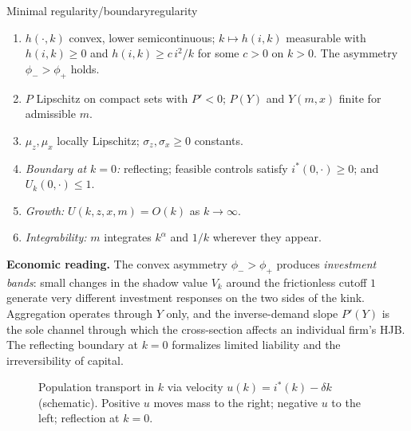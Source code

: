 ﻿\documentclass[11pt,letterpaper,oneside]{article}
\numberwithin{equation}{section}
\newcommand{\1}{\mathbf{1}}
\begin{document}
\begin{assumption}{Minimal regularity/boundary}{regularity}
\begin{enumerate}[label=(\alph*),itemsep=0.2em]
\item $h(\cdot,k)$ convex, lower semicontinuous; $k\mapsto h(i,k)$ measurable with $h(i,k)\ge 0$ and $h(i,k)\ge c\,i^2/k$ for some $c>0$ on $k>0$. The asymmetry $\phi_->\phi_+$ holds.
\item $P$ Lipschitz on compact sets with $P'<0$; $P(Y)$ and $Y(m,x)$ finite for admissible $m$.
\item $\mu_z,\mu_x$ locally Lipschitz; $\sigma_z,\sigma_x\ge 0$ constants.
\item \emph{Boundary at $k=0$:} reflecting; feasible controls satisfy $i^*(0,\cdot)\ge 0$; and $U_k(0,\cdot)\le 1$.
\item \emph{Growth:} $U(k,z,x,m)=O(k)$ as $k\to\infty$.
\item \emph{Integrability:} $m$ integrates $k^\alpha$ and $1/k$ wherever they appear.
\end{enumerate}
\end{assumption}

\begin{tcolorbox}[didacticstyle]
\textbf{Economic reading.} The convex asymmetry $\phi_->\phi_+$ produces \emph{investment bands}: small changes in the shadow value $V_k$ around the frictionless cutoff $1$ generate very different investment responses on the two sides of the kink. Aggregation operates through $Y$ only, and the inverse-demand slope $P'(Y)$ is the sole channel through which the cross-section affects an individual firm's HJB. The reflecting boundary at $k=0$ formalizes limited liability and the irreversibility of capital.
\end{tcolorbox}

\begin{figure}[ht]
\centering
{}
\caption{Population transport in $k$ via velocity $u(k)=i^*(k)-\delta k$ (schematic). Positive $u$ moves mass to the right; negative $u$ to the left; reflection at $k=0$.}
\end{figure}
\end{document}
